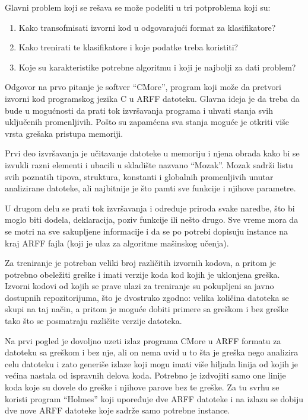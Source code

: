 \documentclass[a4paper]{article}
\theoremstyle{definition}
\begin{document}
{Glavni problem koji se rešava se može podeliti u tri potproblema koji su:
\begin{enumerate}
\item Kako transofmisati izvorni kod u odgovarajući format za klasifikatore?
\item Kako trenirati te klasifikatore i koje podatke treba koristiti?
\item Koje su karakteristike potrebne algoritmu i koji je najbolji za dati problem?
\end{enumerate}



Odgovor na prvo pitanje je softver ``CMore'', program koji može da pretvori izvorni kod programskog
jezika C u ARFF datoteku. Glavna ideja je da treba da bude u mogućnosti da prati tok izvršavanja programa
i uhvati stanja svih uključenih promenljivih. Pošto su zapamćena sva stanja moguće je otkriti više vrsta
grešaka pristupa memoriji.

Prvi deo izvršavanja je učitavanje datoteke u memoriju i njena obrada kako bi se izvukli
razni elementi i ubacili u skladište nazvano ``Mozak''.
Mozak sadrži listu svih poznatih tipova, struktura, konstanti i globalnih promenljivih unutar analizirane datoteke,
ali najbitnije je što pamti sve funkcije i njihove parametre.

U drugom delu se prati tok izvršavanja i određuje
priroda svake naredbe, što bi moglo biti dodela, deklaracija, poziv funkcije ili nešto drugo.
Sve vreme mora da se motri na sve sakupljene informacije i da se po potrebi dopisuju instance na kraj ARFF fajla
(koji je ulaz za algoritme mašinskog učenja).


Za treniranje je potreban veliki broj različitih izvornih kodova, a pritom je potrebno obeležiti greške i imati verzije koda kod kojih je uklonjena greška.
Izvorni kodovi od kojih se prave ulazi za treniranje su pokupljeni sa javno dostupnih repozitorijuma, što je dvostruko zgodno:
velika količina datoteka se skupi na taj način, a pritom je moguće dobiti primere sa greškom i bez greške tako što se posmatraju različite verzije datoteka.

Na prvi pogled je dovoljno uzeti izlaz programa CMore u ARFF formatu za datoteku sa greškom i bez nje, ali on nema uvid u to šta je greška nego analizira celu datoteku i zato
generiše izlaze koji mogu imati više hiljada linija od kojih je većina nastala od ispravnih delova koda.
Potrebno je izdvojiti samo one linije koda koje su dovele do greške i njihove parove bez te greške.
Za tu svrhu se koristi program ``Holmes'' koji upoređuje dve ARFF datoteke i na izlazu se dobiju dve nove ARFF datoteke koje sadrže samo potrebne  instance.

}
\end{document}
